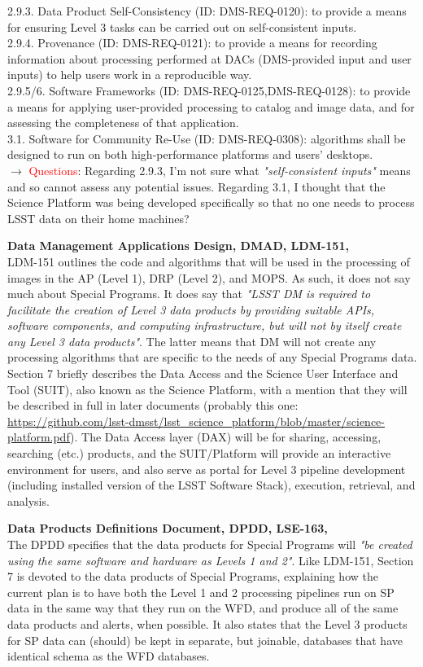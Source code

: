 \documentclass[DM,lsstdraft,toc]{lsstdoc}
\begin{document}
2.9.3. Data Product Self-Consistency (ID: DMS-REQ-0120): to provide a means for ensuring Level 3 tasks can be carried out on self-consistent inputs. \\
2.9.4. Provenance (ID: DMS-REQ-0121): to provide a means for recording information about processing performed at DACs (DMS-provided input and user inputs) to help users work in a reproducible way. \\
2.9.5/6. Software Frameworks (ID: DMS-REQ-0125,DMS-REQ-0128): to provide a means for applying user-provided processing to catalog and image data, and for assessing the completeness of that application. \\
3.1. Software for Community Re-Use (ID: DMS-REQ-0308): algorithms shall be designed to run on both high-performance platforms and users' desktops. \\
$\rightarrow$ \textcolor{red}{Questions}: Regarding 2.9.3, I'm not sure what {\it "self-consistent inputs"} means and so cannot assess any potential issues. Regarding 3.1, I thought that the Science Platform was being developed specifically so that no one needs to process LSST data on their home machines?

\noindent \textbf{Data Management Applications Design, DMAD, LDM-151, \cite{LDM-151}}\\
LDM-151 outlines the code and algorithms that will be used in the processing of images in the AP (Level 1), DRP (Level 2), and MOPS. As such, it does not say much about Special Programs. It does say that {\it "LSST DM is required to facilitate the creation of Level 3 data products by providing suitable APIs, software components, and computing infrastructure, but will not by itself create any Level 3 data products"}. The latter means that DM will not create any processing algorithms that are specific to the needs of any Special Programs data. Section 7 briefly describes the Data Access and the Science User Interface and Tool (SUIT), also known as the Science Platform, with a mention that they will be described in full in later documents  (probably this one: \url{https://github.com/lsst-dmsst/lsst_science_platform/blob/master/science-platform.pdf}). The Data Access layer (DAX) will be for sharing, accessing, searching (etc.) products, and the SUIT/Platform will provide an interactive environment for users, and also serve as portal for Level 3 pipeline development (including installed version of the LSST Software Stack), execution, retrieval, and analysis.

\noindent \textbf{Data Products Definitions Document, DPDD, LSE-163, \cite{LSE-163}}\\
The DPDD specifies that the data products for Special Programs will {\it "be created using the same software and hardware as Levels 1 and 2"}. Like LDM-151, Section 7 is devoted to the data products of Special Programs, explaining how the current plan is to have both the Level 1 and 2 processing pipelines run on SP data in the same way that they run on the WFD, and produce all of the same data products and alerts, when possible. It also states that the Level 3 products for SP data can (should) be kept in separate, but joinable, databases that have identical schema as the WFD databases.
\end{document}
